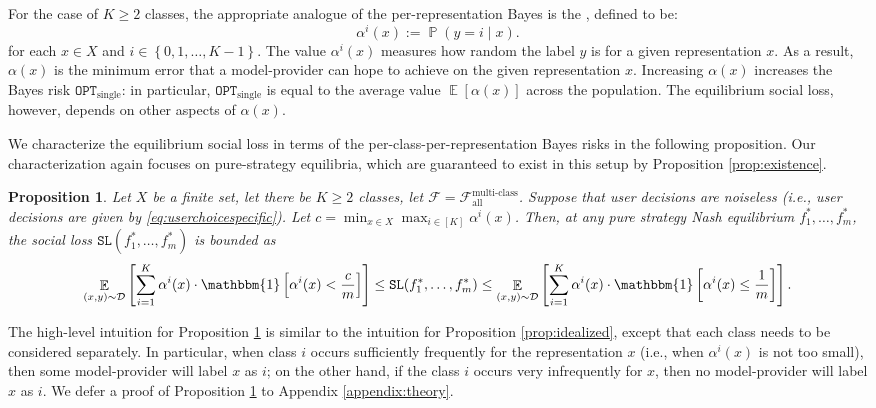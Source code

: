 \documentclass[letterpaper,11pt]{article}
\newtheorem{proposition}{Proposition}
\theoremstyle{plain}
\DeclareMathOperator*{\E}{\mathbb{E}}
\DeclareMathOperator*{\Prob}{\mathbb{P}}
\begin{document}
For the case of $K \ge 2$ classes, the appropriate  analogue of the per-representation Bayes is the , defined to be:
\begin{equation}
\label{eq:alphabayesclass}
 \alpha^i(x) := \Prob(y = i \mid x). 
\end{equation}
for each $x \in X$ and $i \in \left\{0,1,\ldots, K-1\right\}$. The value $\alpha^i(x)$ measures how random the label $y$ is for a given representation $x$. As a result, $\alpha(x)$ is the minimum error that a model-provider can hope to achieve on the given representation $x$. Increasing $\alpha(x)$ increases the Bayes risk $\texttt{OPT}_{\text{single}}$: in particular,  $\texttt{OPT}_{\text{single}}$ is equal to the average value $\E[\alpha(x)]$ across the population. The equilibrium social loss, however, depends on other aspects of $\alpha(x)$.

We characterize the equilibrium social loss in terms of the per-class-per-representation Bayes risks in the following proposition. Our characterization again focuses on  pure-strategy equilibria, which are guaranteed to exist in this setup by Proposition \ref{prop:existence}.
\begin{proposition}
\label{prop:idealizedmulticlass}
Let $X$ be a finite set, let there be $K \ge 2$ classes, let $\mathcal{F} = \mathcal{F}^{\text{multi-class}}_{\text{all}}$. Suppose that user decisions are noiseless (i.e., user decisions are given by \eqref{eq:userchoicespecific}). Let $c = \min_{x \in X} \max_{i \in [K]} \alpha^i(x)$. Then, at any pure strategy Nash equilibrium $f^*_1, \ldots, f^*_m$, the social loss $\texttt{SL}(f^*_1, \ldots, f^*_m)$ is bounded as
\begin{equation}
\label{eq:sociallossmulticlass} 
\E_{(x,y) \sim \mathcal{D}} \left[\sum_{i=1}^K \alpha^i(x) \cdot \mathbbm{1}\left[\alpha^i(x) < \frac{c}{m}\right] \right] \le \texttt{SL}(f^*_1, \ldots, f^*_m) \le  \E_{(x,y) \sim \mathcal{D}} \left[\sum_{i=1}^K \alpha^i(x) \cdot \mathbbm{1}\left[\alpha^i(x) \le \frac{1}{m} \right] \right]. 
\end{equation}
\end{proposition}

The high-level intuition for Proposition \ref{prop:idealizedmulticlass} is similar to the intuition for Proposition \ref{prop:idealized}, except that each class needs to be considered separately. In particular, when class $i$ occurs sufficiently frequently for the representation $x$ (i.e., when $\alpha^i(x)$ is not too small), then some model-provider will label $x$ as $i$; on the other hand, if the class $i$ occurs very infrequently for $x$, then no model-provider will label $x$ as $i$. We defer a proof of Proposition \ref{prop:idealizedmulticlass} to Appendix \ref{appendix:theory}.
\end{document}
